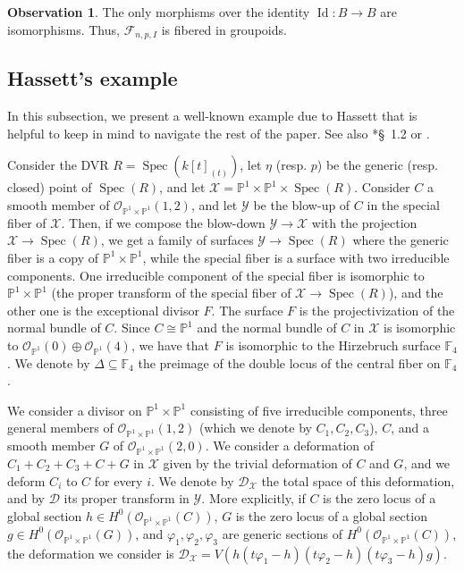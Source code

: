 \documentclass{amsart}
\newcommand{\bF}{\mathbb{F}}
\newcommand{\bP}{\mathbb{P}}
\newcommand{\sF}{\mathscr{F}}
\newcommand{\cD}{\mathcal{D}}
\newcommand{\cO}{\mathcal{O}}
\newcommand{\cX}{\mathcal{X}}
\newcommand{\cY}{\mathcal{Y}}
\newcommand{\spec}{\operatorname{Spec}}
\newcommand{\Id}{\operatorname{Id}}
\theoremstyle{definition}
\newtheorem{Oss}[theorem]{Observation}
\begin{document}
\begin{Oss}
The only morphisms over the identity $\Id \colon B\to B$ are isomorphisms.
Thus, $\sF_{n,p,I}$ is fibered in groupoids.
\end{Oss}

\subsection{Hassett's example} \label{hassett example}
In this subsection, we present a well-known example due to Hassett that is helpful to keep in mind to navigate the rest
of the paper.
See also \cite{KP17}*{\S~1.2} or \cite{kol_new}. 

Consider the DVR $R = \spec(k[t]_{(t)})$, let $\eta$ (resp. $p$) be the generic (resp. closed) point of $\spec(R)$, and let $\cX=\bP^1\times \bP^1 \times \spec(R)$.
Consider $C$ a smooth member of $\cO_{\bP^1\times \bP^1}(1,2)$, and let $\cY$ be the blow-up of $C$ in the special fiber of $\cX$.
Then, if we compose the blow-down $\cY\to \cX$ with the projection $\cX\to \spec(R)$, we get a family of surfaces $\cY\to \spec(R)$ where the generic fiber is a copy of $\bP^1\times \bP^1$, while the special fiber is a surface with two irreducible components.
One irreducible component of the special fiber is isomorphic to $\bP^1\times \bP^1$
(the proper transform of the special fiber of $\cX\to \spec(R)$), and the other one is the exceptional divisor $F$.
The surface $F$ is the projectivization of the normal bundle of $C$.
Since $C\cong \bP^1$ and the normal bundle of $C$ in $\cX$ is isomorphic to $\cO_{\bP^1}(0) \oplus \cO_{\bP^1}(4)$, we have that $F$ is isomorphic to the Hirzebruch surface $\bF_4$.
We denote by $\Delta\subseteq \bF_4$ the preimage of the double locus of the central fiber on $\bF_4$.

We consider a divisor on $\bP^1\times \bP^1$ consisting of five irreducible components, three general members of $\cO_{\bP^1\times \bP^1}(1,2)$ (which we denote by $C_1, C_2, C_3$), $C$, and a smooth member $G$ of $\cO_{\bP^1\times \bP^1}(2,0)$.
We consider a deformation of $C_1+C_2+C_3+C + G$ in $\cX$ given by the trivial deformation of $C$ and $G$, and we deform $C_i$ to $C$ for every $i$.
We denote by $\cD_\cX$ the total space of this deformation, and by $\cD$ its proper transform in $\cY$.
More explicitly, if $C$ is the zero locus of a global section $h\in H^0(\cO_{\bP^1\times \bP^1}(C))$, $G$ is the zero locus of a global section $g\in H^0(\cO_{\bP^1\times \bP^1}(G))$, and $\varphi_1, \varphi_2, \varphi_3$ are generic sections of $H^0(\cO_{\bP^1\times \bP^1}(C))$, the deformation we consider is $\cD_\cX = V(h(t\varphi_1 - h)(t\varphi_2 - h)(t\varphi_3 - h)g)$.
\end{document}
